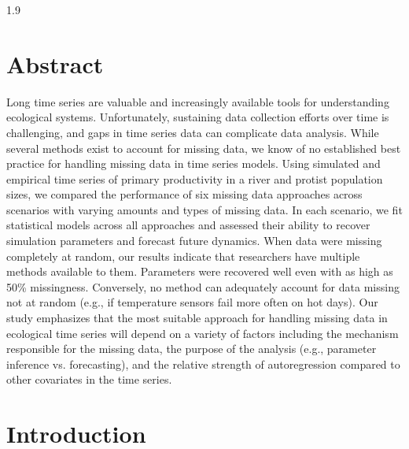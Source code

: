\documentclass[12pt,english]{article} %
\begin{document}
\begin{linenumbers}
\begin{spacing}{1.9}
\begin{flushleft}


\section*{Abstract} %

Long time series are valuable and increasingly available tools for understanding ecological systems. Unfortunately, sustaining data collection efforts over time is challenging, and gaps in time series data can complicate data analysis. While several methods exist to account for missing data, we know of no established best practice for handling missing data in time series models. Using simulated and empirical time series of primary productivity in a river and protist population sizes, we compared the performance of six missing data approaches across scenarios with varying amounts and types of missing data. In each scenario, we fit statistical models across all approaches and assessed their ability to recover simulation parameters and forecast future dynamics. When data were missing completely at random, our results indicate that researchers have multiple methods available to them. Parameters were recovered well even with as high as 50\% missingness. Conversely, no method can adequately account for data missing not at random (e.g., if temperature sensors fail more often on hot days). Our study emphasizes that the most suitable approach for handling missing data in ecological time series will depend on a variety of factors including the mechanism responsible for the missing data, the purpose of the analysis (e.g., parameter inference vs. forecasting), and the relative strength of autoregression compared to other covariates in the time series.


\vspace{-2.5em}
\section*{Introduction} 
\vspace{-1.5em}


\end{flushleft}
\end{spacing}
\end{linenumbers}
\end{document}
